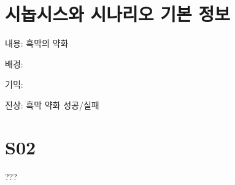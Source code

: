 \documentclass{report}
\begin{document}
	\section{시놉시스와 시나리오 기본 정보}
		내용: 흑막의 약화
		
		배경: 
		
		기믹: 
		
		진상: 흑막 약화 성공/실패
		
	
	\section{S02}
		???
\end{document}
